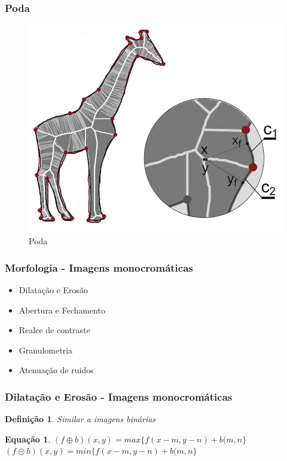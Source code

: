 \documentclass[aspectratio=169]{beamer}
\theoremstyle{Definition}
\newtheorem{defn}{Defini\c c\~ao}
\newtheorem{eq}[theorem]{Equa\c c\~ao}
\begin{document}
\begin{frame}
	\frametitle{Poda}
	
	\begin{figure}[h]
	 	\includegraphics[width=0.6\paperwidth,height=0.6\paperheight]{imagens/prunning}
		\caption{Poda}\label{figLogical}
	\end{figure}
	
\end{frame}

\begin{frame}
	\frametitle{Morfologia - Imagens monocromáticas}
	
	\begin{itemize}
		\item Dilatação e Erosão
		\item Abertura e Fechamento
		\item Realce de contraste
		\item Granulometria
		\item Atenuação de ruidos 
	\end{itemize}
	
	
\end{frame}

\begin{frame}
	\frametitle{Dilatação e Erosão - Imagens monocromáticas}
	
	\begin{defn}
		Similar a imagens binárias
	\end{defn}
	
	\begin{eq}
			$ (f \oplus b)(x,y) = max \{ f(x-m, y-n) + b(m,n \} $ \\
			$ (f \circleddash b)(x,y) = min \{ f(x-m, y-n) + b(m,n \} $
	\end{eq}
	
	
\end{frame}
\end{document}
